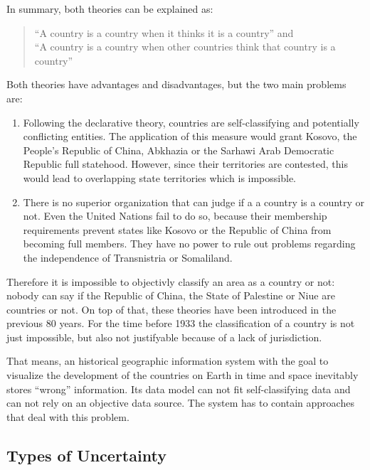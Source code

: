 In summary, both theories can be explained as:
\begin{quote}
  ``A country is a country when it thinks it is a country''
  and \\
  ``A country is a country when other countries think that country is a country''
  \cite{greyCountries}
\end{quote}

Both theories have advantages and disadvantages, but the two main problems are:
\begin{enumerate}
  \item Following the declarative theory, countries are self-classifying and potentially conflicting entities. The application of this measure would grant Kosovo, the People's Republic of China, Abkhazia or the Sarhawi Arab Democratic Republic full statehood. However, since their territories are contested, this would lead to overlapping state territories which is impossible.
  \item There is no superior organization that can judge if a a country is a country or not. Even the United Nations fail to do so, because their membership requirements prevent states like Kosovo or the Republic of China from becoming full members. They have no power to rule out problems regarding the independence of Transnistria or Somaliland.
\end{enumerate}

Therefore it is impossible to objectivly classify an area as a country or not: nobody can say if the Republic of China, the State of Palestine or Niue are countries or not. On top of that, these theories have been introduced in the previous 80 years. For the time before 1933 the classification of a country is not just impossible, but also not justifyable because of a lack of jurisdiction.

That means, an historical geographic information system with the goal to visualize the development of the countries on Earth in time and space inevitably stores ``wrong'' information. Its data model can not fit self-classifying data and can not rely on an objective data source. The system has to contain approaches that deal with this problem.




\subsection{Types of Uncertainty} %
\label{sub:types_of_uncertainty}

